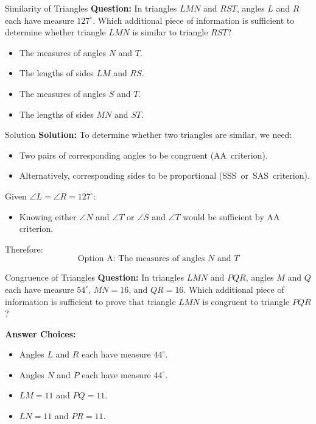 \documentclass{beamer}
\begin{document}
\begin{frame}{Similarity of Triangles}
\textbf{Question:}
In triangles \(LMN\) and \(RST\), angles \(L\) and \(R\) each have measure \(127^\circ\). Which additional piece of information is sufficient to determine whether triangle \(LMN\) is similar to triangle \(RST\)?
\begin{itemize}
    \item[A]The measures of angles \(N\) and \(T\).
    \item[B] The lengths of sides \(LM\) and \(RS\).
    \item[C]The measures of angles \(S\) and \(T\).
    \item[D]The lengths of sides \(MN\) and \(ST\).


\end{itemize}
\end{frame}


\begin{frame}{Solution}
\textbf{Solution:}
To determine whether two triangles are similar, we need:
\begin{itemize}
    \item Two pairs of corresponding angles to be congruent (AA~criterion).
    \item Alternatively, corresponding sides to be proportional (SSS~or~SAS~criterion).
\end{itemize}
Given \( \angle L = \angle R = 127^\circ \):
\begin{itemize}
    \item Knowing either \( \angle N \) and \( \angle T \) or \( \angle S \) and \( \angle T \) would be sufficient by AA criterion.
\end{itemize}
Therefore:
\[
\boxed{\text{Option A: The measures of angles } N \text{ and } T}
\]
\end{frame}


\begin{frame}{Congruence of Triangles}
\textbf{Question:}
In triangles \(LMN\) and \(PQR\), angles \(M\) and \(Q\) each have measure \(54^\circ\), \(MN = 16\), and \(QR = 16\). Which additional piece of information is sufficient to prove that triangle \(LMN\) is congruent to triangle \(PQR\)?

\vspace{1em}
\textbf{Answer Choices:}
\begin{itemize}
    \item[A] Angles \(L\) and \(R\) each have measure \(44^\circ\).
    \item[B] Angles \(N\) and \(P\) each have measure \(44^\circ\).
    \item[C] \(LM = 11\) and \(PQ = 11\).
    \item[D] \(LN = 11\) and \(PR = 11\).
\end{itemize}
\end{frame}
\end{document}
